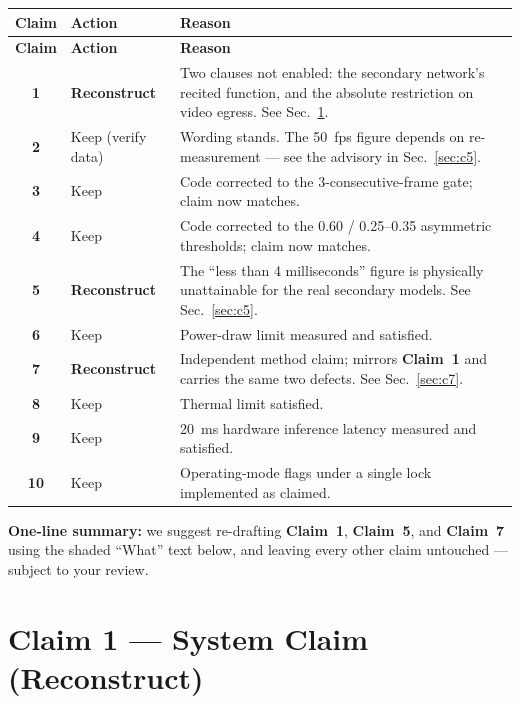 \documentclass[12pt,a4paper]{article}
\newcommand{\clm}[1]{\textbf{Claim~#1}}
\begin{document}
\begin{center}
\renewcommand{\arraystretch}{1.25}
\begin{longtable}{@{}c L{2.7cm} L{7.2cm}@{}}
\toprule
\textbf{Claim} & \textbf{Action} & \textbf{Reason}\\
\midrule
\endfirsthead
\toprule
\textbf{Claim} & \textbf{Action} & \textbf{Reason}\\
\midrule
\endhead
\bottomrule
\endfoot
\textbf{1} & \textbf{Reconstruct} & Two clauses not enabled: the secondary network's recited function, and the absolute restriction on video egress. See Sec.~\ref{sec:c1}.\\
\textbf{2} & Keep (verify data) & Wording stands. The 50~fps figure depends on re-measurement --- see the advisory in Sec.~\ref{sec:c5}.\\
\textbf{3} & Keep & Code corrected to the 3-consecutive-frame gate; claim now matches.\\
\textbf{4} & Keep & Code corrected to the 0.60 / 0.25--0.35 asymmetric thresholds; claim now matches.\\
\textbf{5} & \textbf{Reconstruct} & The ``less than 4 milliseconds'' figure is physically unattainable for the real secondary models. See Sec.~\ref{sec:c5}.\\
\textbf{6} & Keep & Power-draw limit measured and satisfied.\\
\textbf{7} & \textbf{Reconstruct} & Independent method claim; mirrors \clm{1} and carries the same two defects. See Sec.~\ref{sec:c7}.\\
\textbf{8} & Keep & Thermal limit satisfied.\\
\textbf{9} & Keep & 20~ms hardware inference latency measured and satisfied.\\
\textbf{10} & Keep & Operating-mode flags under a single lock implemented as claimed.\\
\end{longtable}
\end{center}

\begin{notebox}
\textbf{One-line summary:} we suggest re-drafting \clm{1}, \clm{5}, and \clm{7} using the
shaded ``What'' text below, and leaving every other claim untouched --- subject to your review.
\end{notebox}

\section{Claim 1 --- System Claim (Reconstruct)}\label{sec:c1}
\end{document}

